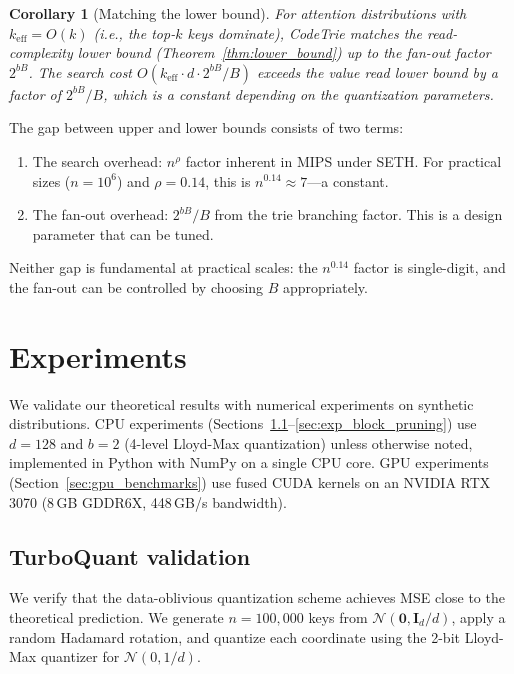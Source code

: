 \documentclass[10pt,twocolumn]{article}
\newtheorem{corollary}[theorem]{Corollary}
\theoremstyle{definition}
\newcommand{\calN}{\mathcal{N}}
\begin{document}
\begin{corollary}[Matching the lower bound]
  \label{cor:matching}
  For attention distributions with $k_{\text{eff}} = O(k)$ (i.e., the top-$k$
  keys dominate), CodeTrie matches the read-complexity lower bound
  (Theorem~\ref{thm:lower_bound}) up to the fan-out factor $2^{bB}$.  The
  search cost $O(k_{\text{eff}} \cdot d \cdot 2^{bB}/B)$ exceeds the value
  read lower bound by a factor of $2^{bB}/B$, which is a constant depending on
  the quantization parameters.
\end{corollary}

The gap between upper and lower bounds consists of two terms:
\begin{enumerate}[nosep]
  \item The search overhead: $n^{\rho}$ factor inherent in MIPS under SETH.
        For practical sizes ($n = 10^6$) and $\rho = 0.14$, this is $n^{0.14}
        \approx 7$---a constant.
  \item The fan-out overhead: $2^{bB}/B$ from the trie branching factor.  This
        is a design parameter that can be tuned.
\end{enumerate}

Neither gap is fundamental at practical scales: the $n^{0.14}$ factor is
single-digit, and the fan-out can be controlled by choosing $B$ appropriately.


\section{Experiments}
\label{sec:experiments}

We validate our theoretical results with numerical experiments on synthetic
distributions.  CPU experiments (Sections~\ref{sec:exp_turboquant}--\ref{sec:exp_block_pruning})
use $d = 128$ and $b = 2$ (4-level Lloyd-Max
quantization) unless otherwise noted, implemented in Python with NumPy on a
single CPU core.  GPU experiments (Section~\ref{sec:gpu_benchmarks}) use fused
CUDA kernels on an NVIDIA RTX 3070 (8\,GB GDDR6X, 448\,GB/s bandwidth).

\subsection{TurboQuant validation}
\label{sec:exp_turboquant}

We verify that the data-oblivious quantization scheme achieves MSE close to the
theoretical prediction.  We generate $n = 100{,}000$ keys from $\calN(\mathbf{0},
\mathbf{I}_d / d)$, apply a random Hadamard rotation, and quantize each
coordinate using the 2-bit Lloyd-Max quantizer for $\calN(0, 1/d)$.
\end{document}
